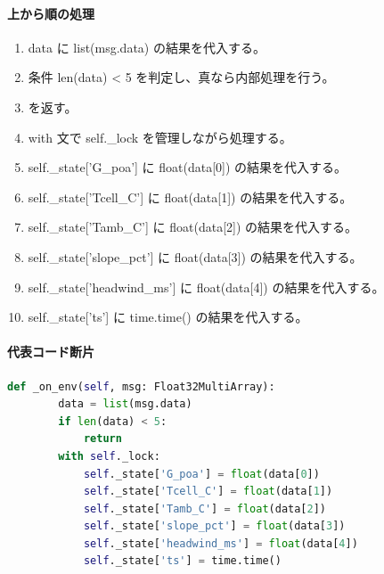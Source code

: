 \documentclass[a4paper,11pt]{article}
\begin{document}
            \paragraph{上から順の処理}
            \begin{enumerate}[leftmargin=1.8em]
            \item data に list(msg.data) の結果を代入する。
\item 条件 len(data) < 5 を判定し、真なら内部処理を行う。
\item    を返す。
\item with 文で self.\_lock を管理しながら処理する。
\item   self.\_state['G\_poa'] に float(data[0]) の結果を代入する。
\item   self.\_state['Tcell\_C'] に float(data[1]) の結果を代入する。
\item   self.\_state['Tamb\_C'] に float(data[2]) の結果を代入する。
\item   self.\_state['slope\_pct'] に float(data[3]) の結果を代入する。
\item   self.\_state['headwind\_ms'] に float(data[4]) の結果を代入する。
\item   self.\_state['ts'] に time.time() の結果を代入する。
            \end{enumerate}
            \paragraph{代表コード断片}
            \begin{lstlisting}[language=Python]
    def _on_env(self, msg: Float32MultiArray):
        data = list(msg.data)
        if len(data) < 5:
            return
        with self._lock:
            self._state['G_poa'] = float(data[0])
            self._state['Tcell_C'] = float(data[1])
            self._state['Tamb_C'] = float(data[2])
            self._state['slope_pct'] = float(data[3])
            self._state['headwind_ms'] = float(data[4])
            self._state['ts'] = time.time()
\end{lstlisting}
\end{document}
